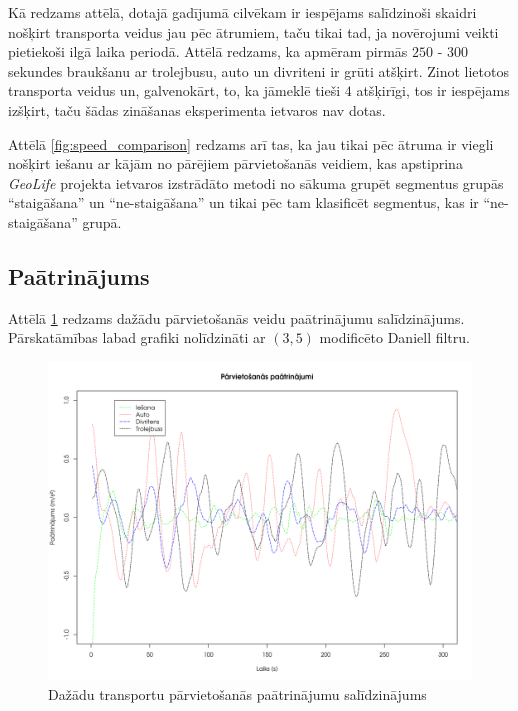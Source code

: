 \documentclass{ludis}
\begin{document}
Kā redzams attēlā, dotajā gadījumā cilvēkam ir iespējams salīdzinoši skaidri nošķirt transporta 
veidus jau pēc ātrumiem, taču tikai tad, ja novērojumi veikti pietiekoši ilgā laika periodā.
Attēlā redzams, ka apmēram pirmās $250$ - $300$ sekundes braukšanu ar trolejbusu, auto un divriteni
ir grūti atšķirt. Zinot lietotos transporta veidus un, galvenokārt, to, ka jāmeklē tieši $4$ 
atšķirīgi, tos ir iespējams izšķirt, taču šādas zināšanas eksperimenta ietvaros nav dotas.

Attēlā \ref{fig:speed_comparison} redzams arī tas, ka jau tikai pēc ātruma ir viegli nošķirt iešanu
ar kājām no pārējiem pārvietošanās veidiem, kas apstiprina \emph{GeoLife} projekta ietvaros
izstrādāto metodi no sākuma grupēt segmentus grupās ``staigāšana'' un ``ne-staigāšana'' un tikai
pēc tam klasificēt segmentus, kas ir ``ne-staigāšana'' grupā. ~\cite{zheng_gps_segmentation}

\subsection{Paātrinājums}
Attēlā \ref{fig:acceleration_comparison} redzams dažādu pārvietošanās veidu paātrinājumu 
salīdzinājums. Pārskatāmības labad grafiki nolīdzināti ar $(3, 5)$ modificēto Daniell filtru.

\begin{figure}
  \centering
  \includegraphics[scale=0.5]{img/acceleration_comparison}
  \caption{Dažādu transportu pārvietošanās paātrinājumu salīdzinājums}
  \label{fig:acceleration_comparison}
\end{figure}
\end{document}
